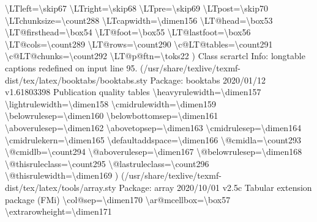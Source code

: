 \documentclass[
  letterpaper,
  DIV=11,
  numbers=noendperiod]{scrartcl}
\newenvironment{Shaded}{\begin{snugshade}}{\end{snugshade}}
\newcommand{\NormalTok}[1]{\textcolor[rgb]{0.00,0.23,0.31}{#1}}
\begin{document}
\begin{Shaded}
\begin{Highlighting}[]
\NormalTok{\textbackslash{}LTleft=\textbackslash{}skip67}
\NormalTok{\textbackslash{}LTright=\textbackslash{}skip68}
\NormalTok{\textbackslash{}LTpre=\textbackslash{}skip69}
\NormalTok{\textbackslash{}LTpost=\textbackslash{}skip70}
\NormalTok{\textbackslash{}LTchunksize=\textbackslash{}count288}
\NormalTok{\textbackslash{}LTcapwidth=\textbackslash{}dimen156}
\NormalTok{\textbackslash{}LT@head=\textbackslash{}box53}
\NormalTok{\textbackslash{}LT@firsthead=\textbackslash{}box54}
\NormalTok{\textbackslash{}LT@foot=\textbackslash{}box55}
\NormalTok{\textbackslash{}LT@lastfoot=\textbackslash{}box56}
\NormalTok{\textbackslash{}LT@cols=\textbackslash{}count289}
\NormalTok{\textbackslash{}LT@rows=\textbackslash{}count290}
\NormalTok{\textbackslash{}c@LT@tables=\textbackslash{}count291}
\NormalTok{\textbackslash{}c@LT@chunks=\textbackslash{}count292}
\NormalTok{\textbackslash{}LT@p@ftn=\textbackslash{}toks22}
\NormalTok{)}
\NormalTok{Class scrartcl Info: longtable captions redefined on input line 95.}
\NormalTok{(/usr/share/texlive/texmf{-}dist/tex/latex/booktabs/booktabs.sty}
\NormalTok{Package: booktabs 2020/01/12 v1.61803398 Publication quality tables}
\NormalTok{\textbackslash{}heavyrulewidth=\textbackslash{}dimen157}
\NormalTok{\textbackslash{}lightrulewidth=\textbackslash{}dimen158}
\NormalTok{\textbackslash{}cmidrulewidth=\textbackslash{}dimen159}
\NormalTok{\textbackslash{}belowrulesep=\textbackslash{}dimen160}
\NormalTok{\textbackslash{}belowbottomsep=\textbackslash{}dimen161}
\NormalTok{\textbackslash{}aboverulesep=\textbackslash{}dimen162}
\NormalTok{\textbackslash{}abovetopsep=\textbackslash{}dimen163}
\NormalTok{\textbackslash{}cmidrulesep=\textbackslash{}dimen164}
\NormalTok{\textbackslash{}cmidrulekern=\textbackslash{}dimen165}
\NormalTok{\textbackslash{}defaultaddspace=\textbackslash{}dimen166}
\NormalTok{\textbackslash{}@cmidla=\textbackslash{}count293}
\NormalTok{\textbackslash{}@cmidlb=\textbackslash{}count294}
\NormalTok{\textbackslash{}@aboverulesep=\textbackslash{}dimen167}
\NormalTok{\textbackslash{}@belowrulesep=\textbackslash{}dimen168}
\NormalTok{\textbackslash{}@thisruleclass=\textbackslash{}count295}
\NormalTok{\textbackslash{}@lastruleclass=\textbackslash{}count296}
\NormalTok{\textbackslash{}@thisrulewidth=\textbackslash{}dimen169}
\NormalTok{) (/usr/share/texlive/texmf{-}dist/tex/latex/tools/array.sty}
\NormalTok{Package: array 2020/10/01 v2.5c Tabular extension package (FMi)}
\NormalTok{\textbackslash{}col@sep=\textbackslash{}dimen170}
\NormalTok{\textbackslash{}ar@mcellbox=\textbackslash{}box57}
\NormalTok{\textbackslash{}extrarowheight=\textbackslash{}dimen171}

\end{Highlighting}
\end{Shaded}
\end{document}
